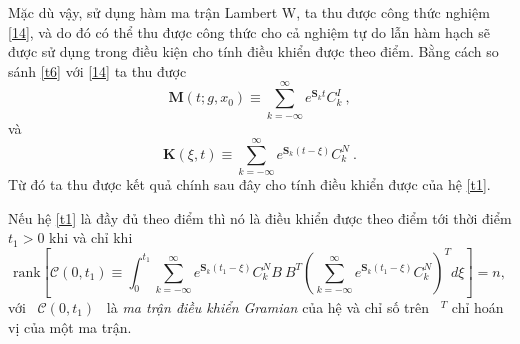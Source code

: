 Mặc dù vậy, sử dụng hàm ma trận Lambert W, ta thu được công thức nghiệm \eqref{14}, và do đó có thể thu được công thức cho cả nghiệm tự do lẫn hàm hạch sẽ được sử dụng trong điều kiện cho tính điều khiển được theo điểm. Bằng cách so sánh \eqref{t6}  với \eqref{14} ta thu được
%
\begin{equation}\label{t10}
\mathbf{M}(t;g,x_0)\equiv\sum\limits^\infty_{k=-\infty}e^{\mathbf{S}_k t}C^I_k \ ,
\end{equation}
%
và
%
\begin{equation}\label{t7}
\mathbf{K}(\xi, t) \equiv \sum\limits^\infty_{k=-\infty} e^{\mathbf{S}_k(t-\xi)}C^N_k \ .
\end{equation}
%
Từ đó ta thu được kết quả chính sau đây cho tính điều khiển được của hệ \eqref{t1}.
%
\begin{dly}\label{tdly1}
Nếu hệ \eqref{t1} là đầy đủ theo điểm thì nó là điều khiển được theo điểm tới thời điểm $t_1 > 0$ khi và chỉ khi
	\begin{equation}\label{t8}
	\mathrm{rank} \left[\mathcal{C}(0,t_1)\equiv \int^{t_1}_0\sum\limits^\infty_{k=-\infty}e^{\mathbf{S}_k(t_1-\xi)}C^N_kB \ B^T\left(\sum\limits^\infty_{k=-\infty}e^{\mathbf{S}_k(t_1-\xi)}C^N_k\right)^Td\xi\right]\!=\!n,
	\end{equation}
	với \ $\mathcal{C}(0,t_1)$ \ là \textit{ma trận điều khiển Gramian} của hệ và chỉ số trên \ $^T$ chỉ hoán vị của một ma trận.
\end{dly}
